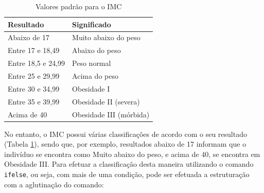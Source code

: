 \documentclass[12pt,brazil,oneside]{book}
\newenvironment{Shaded}{\begin{snugshade}}{\end{snugshade}}
\newcommand{\DecValTok}[1]{\textcolor[rgb]{0.00,0.00,0.81}{#1}}
\newcommand{\FloatTok}[1]{\textcolor[rgb]{0.00,0.00,0.81}{#1}}
\newcommand{\KeywordTok}[1]{\textcolor[rgb]{0.13,0.29,0.53}{\textbf{#1}}}
\newcommand{\NormalTok}[1]{#1}
\newcommand{\OperatorTok}[1]{\textcolor[rgb]{0.81,0.36,0.00}{\textbf{#1}}}
\newcommand{\StringTok}[1]{\textcolor[rgb]{0.31,0.60,0.02}{#1}}
\begin{document}
\begin{table}

\caption{\label{tab:imct}Valores padrão para o IMC}
\centering
\begin{tabular}[t]{l|l}
\hline
Resultado & Significado\\
\hline
Abaixo de 17 & Muito abaixo do peso\\
\hline
Entre 17 e 18,49 & Abaixo do peso\\
\hline
Entre 18,5 e 24,99 & Peso normal\\
\hline
Entre 25 e 29,99 & Acima do peso\\
\hline
Entre 30 e 34,99 & Obesidade I\\
\hline
Entre 35 e 39,99 & Obesidade II (severa)\\
\hline
Acima de 40 & Obesidade III (mórbida)\\
\hline
\end{tabular}
\end{table}

No entanto, o IMC possui várias classificações de acordo com o seu
resultado (Tabela \ref{tab:imct}), sendo que, por exemplo, resultados
abaixo de 17 informam que o indivíduo se encontra como Muito abaixo do
peso, e acima de 40, se encontra em Obesidade III. Para efetuar a
classificação desta maneira utilizando o comando \texttt{ifelse}, ou
seja, com mais de uma condição, pode ser efetuada a estruturação com a
aglutinação do comando:

\begin{Shaded}
\end{Shaded}
\end{document}

